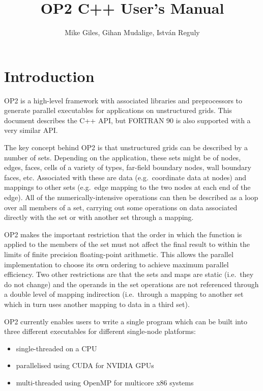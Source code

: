 \documentclass[11pt]{article}
\begin{document}
\title{OP2 C++ User's Manual}
\author{Mike Giles, Gihan Mudalige, Istv{\'a}n Reguly}
\maketitle


\newpage
\section{Introduction}

OP2 is a high-level framework with associated libraries and
preprocessors to generate parallel executables for applications
on unstructured grids.  This document describes the C++ API,
but FORTRAN 90 is also supported with a very similar API.

The key concept behind OP2 is that unstructured grids can be
described by a number of sets.  Depending on the application,
these sets might be of nodes, edges, faces, cells of a variety
of types, far-field boundary nodes, wall boundary faces, etc.
Associated with these are data (e.g.~coordinate data at nodes)
and mappings to other sets (e.g.~edge mapping to the two nodes
at each end of the edge).  All of the numerically-intensive
operations can then be described as a loop over all members of
a set, carrying out some operations on data associated directly
with the set or with another set through a mapping.

OP2 makes the important restriction that the order in which the
function is applied to the members of the set must not affect the
final result to within the limits of finite precision floating-point arithmetic.
This allows the parallel implementation to choose
its own ordering to achieve maximum parallel efficiency.
Two other restrictions are that the sets and maps are static
(i.e.~they do not change) and the operands in the set operations
are not referenced through a double level of mapping indirection
(i.e.~through a mapping to another set which in turn uses another
mapping to data in a third set).

OP2 currently enables users to write a single program which can be
built into three different executables for different single-node
platforms:
\begin{itemize}
\item
single-threaded on a CPU
\item
parallelised using CUDA for NVIDIA GPUs
\item
multi-threaded using OpenMP for multicore x86 systems
\end{itemize}
\end{document}
